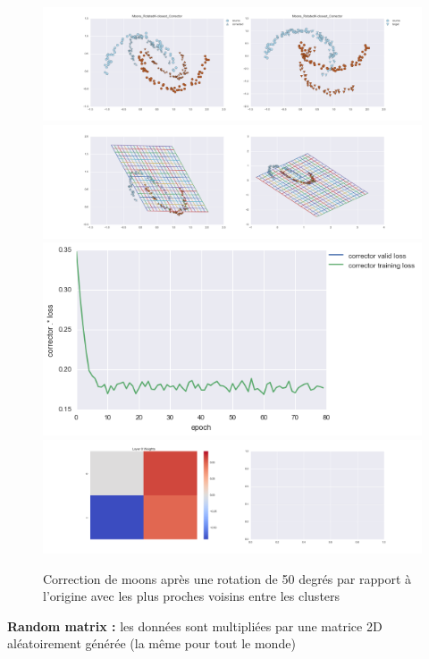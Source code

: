 \begin{figure}[H] %
\centering
\includegraphics[width=\linewidth]{fig/24-05-2016/moons/Moons_RotatedK-closest_Corrector-DATA.png}
\includegraphics[width=\linewidth]{fig/24-05-2016/moons/Moons_RotatedK-closest_Corrector-GridCheck.png}
\includegraphics[width=0.45\linewidth]{fig/24-05-2016/moons/Moons_RotatedK-closest_Corrector-Learning_curve.png}
\includegraphics[width=\linewidth]{fig/24-05-2016/moons/Moons_RotatedK-closest_Corrector-W.png}
\caption{Correction de moons après une rotation de 50 degrés par rapport à l'origine avec les plus proches voisins entre les clusters}
\label{fig:recap-moons-rot-exhaustive}
\end{figure}


{\Large \textbf{Random matrix :}} les données sont multipliées par une matrice 2D aléatoirement générée
 (la même pour tout le monde)

